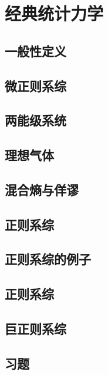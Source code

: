 \chapter{经典统计力学}

\section{一般性定义}
\section{微正则系综}
\section{两能级系统}
\section{理想气体}
\section{混合熵与{\gibbs}佯谬}
\section{正则系综}
\section{正则系综的例子}
\section{{\gibbs}正则系综}
\section{巨正则系综}
\section*{习题}